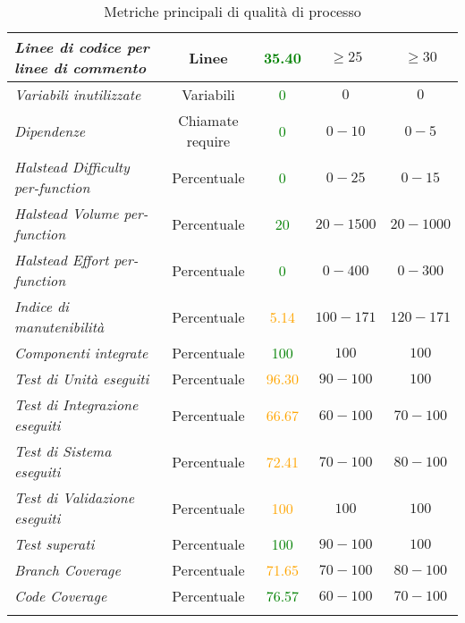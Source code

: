 \begin{longtable}{|>{\centering}m{5cm}|c|c|c|c|}
\emph{Linee di codice per linee di commento} & {Linee} & \textcolor{Green}{35.40} & $\geq 25$ & $\geq 30$\\ \hline
\emph{Variabili inutilizzate} & {Variabili} & \textcolor{Green}{0} & $0$ & $0$\\ \hline
\emph{Dipendenze} & {Chiamate require} & \textcolor{Green}{0} & $0 - 10$ & $0 - 5$\\ \hline
\emph{Halstead Difficulty per-function} & {Percentuale} & \textcolor{Green}{0} & $0 - 25$ & $0 - 15$\\ \hline
\emph{Halstead Volume per-function} & {Percentuale} & \textcolor{Green}{20} & $20 - 1500$ & $20 - 1000$\\ \hline
\emph{Halstead Effort per-function} & {Percentuale} & \textcolor{Green}{0} & $0 - 400$ & $0 - 300$\\ \hline
\emph{Indice di manutenibilità} & {Percentuale} & \textcolor{Orange}{5.14} & $100 - 171$ & $120 - 171$\\ \hline
\emph{Componenti integrate} & {Percentuale} & \textcolor{Green}{100} & $100$ & $100$\\ \hline
\emph{Test di Unità eseguiti} & {Percentuale} & \textcolor{Orange}{96.30} & $90 - 100$ & $100$\\ \hline
\emph{Test di Integrazione eseguiti} & {Percentuale} & \textcolor{Orange}{66.67} & $60 - 100$ & $70 - 100$\\ \hline
\emph{Test di Sistema eseguiti} & {Percentuale} & \textcolor{Orange}{72.41} & $70 - 100$ & $80 - 100$\\ \hline
\emph{Test di Validazione eseguiti} & {Percentuale} & \textcolor{Orange}{100} & $100$ & $100$\\ \hline
\emph{Test superati} & {Percentuale} & \textcolor{Green}{100} & $90 - 100$ & $100$\\ \hline
\emph{Branch Coverage} & {Percentuale} & \textcolor{Orange}{71.65} & $70 - 100$ & $80 - 100$\\ \hline
\emph{Code Coverage} & {Percentuale} & \textcolor{Green}{76.57} & $60 - 100$ & $70 - 100$\\ \hline
\caption{Metriche principali di qualità di processo}
\end{longtable}

